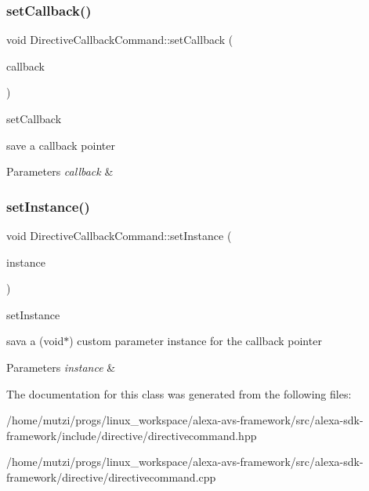 \subsubsection{\texorpdfstring{set\+Callback()}{setCallback()}}
{\footnotesize\ttfamily void Directive\+Callback\+Command\+::set\+Callback (\begin{DoxyParamCaption}\item[{Directive\+Callback}]{callback }\end{DoxyParamCaption})}



set\+Callback 

save a callback pointer 
\begin{DoxyParams}{Parameters}
{\em callback} & \\
\hline
\end{DoxyParams}
\mbox{\label{classdirective_1_1DirectiveCallbackCommand_a272ae306407befe146d49198352b96bc}} 
\subsubsection{\texorpdfstring{set\+Instance()}{setInstance()}}
{\footnotesize\ttfamily void Directive\+Callback\+Command\+::set\+Instance (\begin{DoxyParamCaption}\item[{void $\ast$}]{instance }\end{DoxyParamCaption})}



set\+Instance 

sava a (void$\ast$) custom parameter instance for the callback pointer 
\begin{DoxyParams}{Parameters}
{\em instance} & \\
\hline
\end{DoxyParams}


The documentation for this class was generated from the following files\+:\begin{DoxyCompactItemize}
\item 
/home/mutzi/progs/linux\+\_\+workspace/alexa-\/avs-\/framework/src/alexa-\/sdk-\/framework/include/directive/directivecommand.\+hpp\item 
/home/mutzi/progs/linux\+\_\+workspace/alexa-\/avs-\/framework/src/alexa-\/sdk-\/framework/directive/directivecommand.\+cpp\end{DoxyCompactItemize}
